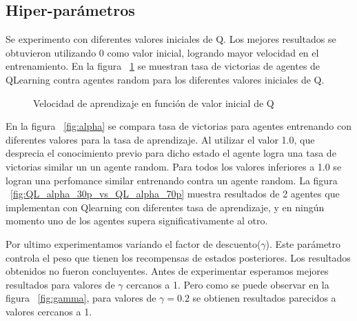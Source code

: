 
\subsection{Hiper-parámetros}

Se experimento con diferentes valores iniciales de Q. Los mejores resultados se obtuvieron utilizando 0 como valor inicial, logrando mayor velocidad en el entrenamiento. En la figura ~\ref{fig:qinit} se muestran tasa de victorias de agentes de QLearning contra agentes random para los diferentes valores iniciales de Q.   
\begin{figure}[H]
\begin{center}
\caption{Velocidad de aprendizaje en función de valor inicial de Q}
\label{fig:qinit}
\end{center}
\end{figure}


En la figura ~\ref{fig:alpha} se compara tasa de victorias para agentes entrenando con diferentes valores para la tasa de aprendizaje. Al utilizar el valor 1.0, que desprecia el conocimiento previo para dicho estado el agente logra una tasa de victorias similar un un agente random. Para todos los valores inferiores a 1.0 se logran una perfomance similar entrenando contra un agente random. La figura ~\ref{fig:QL_alpha_30p_vs_QL_alpha_70p} muestra resultados de 2 agentes que implementan con Qlearning con diferentes tasa de aprendizaje, y en ningún momento uno de los agentes supera significativamente al otro. 
 
\begin{figure}[H]
\begin{center}
\caption{}
\label{fig:alphag}
\end{center}
\end{figure}

Por ultimo experimentamos variando el factor de descuento($\gamma$). Este parámetro controla el peso que tienen los recompensas de estados posteriores. Los resultados obtenidos no fueron concluyentes. Antes de experimentar esperamos mejores resultados para valores de $\gamma$ cercanos a 1. Pero como se puede observar en la figura ~\ref{fig:gamma}, para valores de  $\gamma=0.2$ se obtienen resultados parecidos a valores cercanos a 1.


